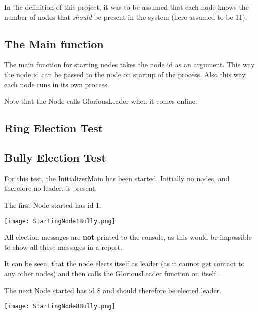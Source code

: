 In the definition of this project, it was to be assumed that each node knows the number of nodes that \textit{should} be present in the system (here assumed to be 11).

\subsection{The Main function}
The main function for starting nodes takes the node id as an argument. This way the node id can be passed to the node on startup of the process. Also this way, each node runs in its own process.

\begin{center}
\end{center}

Note that the Node calls GloriousLeader when it comes online. 

\subsection{Ring Election Test}

\subsection{Bully Election Test}
For this test, the InitializerMain has been started. Initially no nodes, and therefore no leader, is present. 

The first Node started has id 1.

\begin{center}
	\texttt{[image: StartingNode1Bully.png]}
\end{center}

All election messages are \textbf{not} printed to the console, as this would be impossible to show all these messages in a report.

It can be seen, that the node elects itself as leader (as it cannot get contact to any other nodes) and then calls the GloriousLeader function on itself. 

The next Node started has id 8 and should therefore be elected leader.

\begin{center}
	\texttt{[image: StartingNode8Bully.png]}
\end{center}

